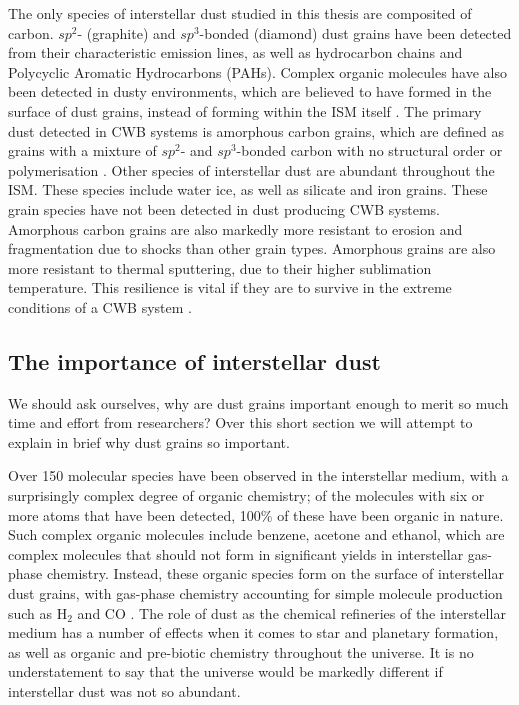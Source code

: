 The only species of interstellar dust studied in this thesis are composited of carbon.
$sp^2$- (graphite) and $sp^3$-bonded (diamond) dust grains have been detected from their characteristic emission lines, as well as hydrocarbon chains and Polycyclic Aromatic Hydrocarbons (PAHs).
Complex organic molecules have also been detected in dusty environments, which are believed to have formed in the surface of dust grains, instead of forming within the ISM itself
\parencite{herbstComplexOrganicInterstellar2009}.
The primary dust detected in CWB systems is amorphous carbon grains, which are defined as grains with a mixture of $sp^2$- and $sp^3$-bonded carbon with no structural order or polymerisation
\parencite{draineInterstellarDustGrains2003}.
Other species of interstellar dust are abundant throughout the ISM.
These species include water ice, as well as silicate and iron grains.
These grain species have not been detected in dust producing CWB systems.
Amorphous carbon grains are also markedly more resistant to erosion and fragmentation due to shocks than other grain types.
Amorphous grains are also more resistant to thermal sputtering, due to their higher sublimation temperature.
This resilience is vital if they are to survive in the extreme conditions of a CWB system
\parencite{draineDestructionMechanismsInterstellar1979}.

\subsection{The importance of interstellar dust}
\label{sec:dustimportance}

We should ask ourselves, why are dust grains important enough to merit so much time and effort from researchers?
Over this short section we will attempt to explain in brief why dust grains so important.


Over 150 molecular species have been observed in the interstellar medium, with a surprisingly complex degree of organic chemistry; of the molecules with six or more atoms that have been detected, 100\% of these have been organic in nature.
Such complex organic molecules include benzene, acetone and ethanol, which are complex molecules that should not form in significant yields in interstellar gas-phase chemistry.
Instead, these organic species form on the surface of interstellar dust grains, with gas-phase chemistry accounting for simple molecule production such as $\text{H}_2$ and $\text{CO}$
\parencite{herbstComplexOrganicInterstellar2009}.
The role of dust as the chemical refineries of the interstellar medium has a number of effects when it comes to star and planetary formation, as well as organic and pre-biotic chemistry throughout the universe.
It is no understatement to say that the universe would be markedly different if interstellar dust was not so abundant.

